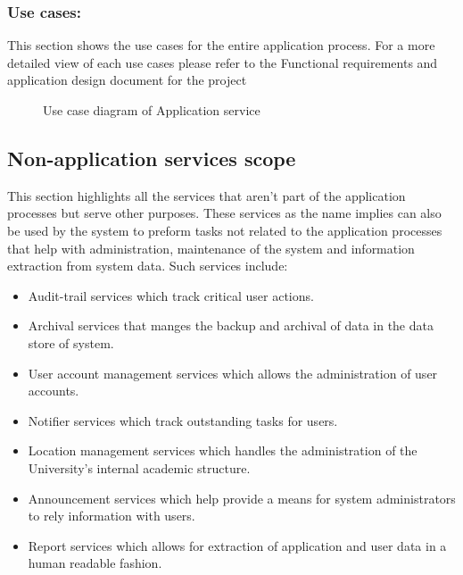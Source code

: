 \documentclass[12pt]{article}
\begin{document}
\newpage
\subsubsection{Use cases:}
This section shows the use cases for the entire application process. For a more  detailed view of each use cases please refer to the Functional requirements and application design document for the project 

\begin{figure}[H]
\centering	
{}
\caption{Use case diagram of Application service}
\end{figure}

\newpage
\vspace{0.2in}
\subsection{Non-application services scope}
This section highlights all the services that aren't part of the application processes but serve other purposes. These services as the name implies can also be used by the system to preform tasks not related to the application processes that help with administration, maintenance of the system and information extraction from system data. Such services include:
\begin{itemize}
	\item Audit-trail services which track critical user actions.
	\item Archival services that manges the backup and archival of data in the data store of system.
	\item User account management services which allows the administration of user accounts.
	\item Notifier services which track outstanding tasks for users.
	\item Location management services which handles the administration of the University's internal academic structure.
	\item Announcement services which help provide a means for system administrators to rely information with users.
	\item Report services which allows for extraction of application and user data in a human readable fashion. 
\end{itemize}
 
\end{document}
